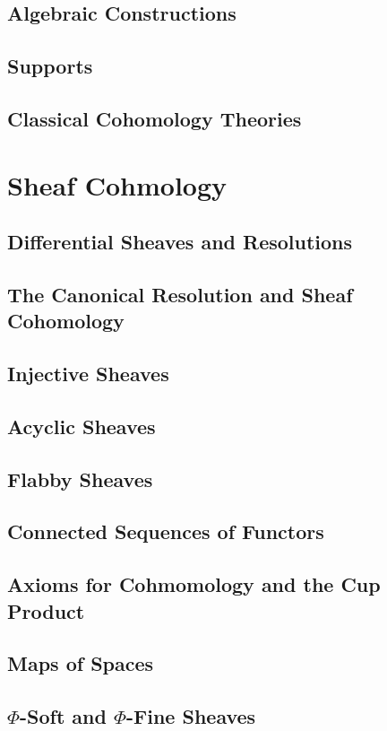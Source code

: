 \subsection{Algebraic Constructions}
\subsection{Supports}
\subsection{Classical Cohomology Theories}

\section{Sheaf Cohmology}
\subsection{Differential Sheaves and Resolutions}
\subsection{The Canonical Resolution and Sheaf Cohomology}
\subsection{Injective Sheaves}
\subsection{Acyclic Sheaves}
\subsection{Flabby Sheaves}
\subsection{Connected Sequences of Functors}
\subsection{Axioms for Cohmomology and the Cup Product}
\subsection{Maps of Spaces}
\subsection{$\Phi$-Soft and $\Phi$-Fine Sheaves}
